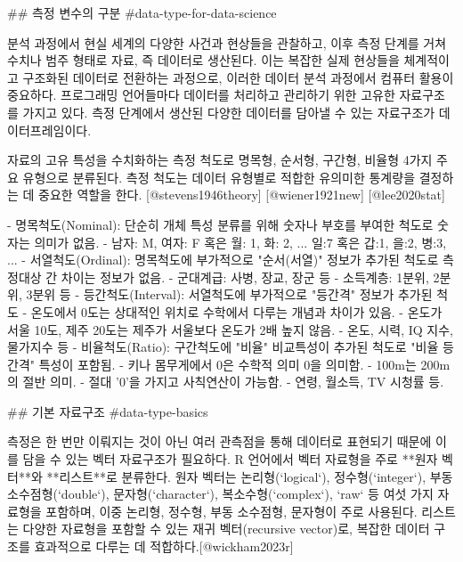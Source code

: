 \documentclass[
  letterpaper,
]{book}
\begin{document}
{## 측정 변수의 구분 {#data-type-for-data-science}


분석 과정에서 현실 세계의 다양한 사건과 현상들을 관찰하고, 이후 측정 단계를 거쳐 수치나 범주 형태로 자료, 즉 데이터로 생산된다.
이는 복잡한 실제 현상들을 체계적이고 구조화된 데이터로 전환하는 과정으로, 이러한 데이터 분석 과정에서 컴퓨터 활용이 중요하다.
프로그래밍 언어들마다 데이터를 처리하고 관리하기 위한 고유한 자료구조를 가지고 있다.
측정 단계에서 생산된 다양한 데이터를 담아낼 수 있는 자료구조가 데이터프레임이다.

자료의 고유 특성을 수치화하는 측정 척도로 명목형, 순서형, 구간형, 비율형 4가지 주요 유형으로 분류된다.
측정 척도는 데이터 유형별로 적합한 유의미한 통계량을 결정하는 데 중요한 역할을 한다.
[@stevens1946theory] [@wiener1921new] [@lee2020stat]

    

-   명목척도(Nominal): 단순히 개체 특성 분류를 위해 숫자나 부호를 부여한 척도로 숫자는 의미가 없음.
    -   남자: M, 여자: F 혹은 월: 1, 화: 2, ... 일:7 혹은 갑:1, 을:2, 병:3, ...
-   서열척도(Ordinal): 명목척도에 부가적으로 "순서(서열)" 정보가 추가된 척도로 측정대상 간 차이는 정보가 없음.
    -   군대계급: 사병, 장교, 장군 등
    -   소득계층: 1분위, 2분위, 3분위 등
-   등간척도(Interval): 서열척도에 부가적으로 "등간격" 정보가 추가된 척도
    -   온도에서 0도는 상대적인 위치로 수학에서 다루는 개념과 차이가 있음.
    -   온도가 서울 10도, 제주 20도는 제주가 서울보다 온도가 2배 높지 않음.
    -   온도, 시력, IQ 지수, 물가지수 등
-   비율척도(Ratio): 구간척도에 "비율" 비교특성이 추가된 척도로 "비율 등간격" 특성이 포함됨.
    -   키나 몸무게에서 0은 수학적 의미 0을 의미함.
    -   100m는 200m의 절반 의미.
    -   절대 '0'을 가지고 사칙연산이 가능함.
    -   연령, 월소득, TV 시청률 등.

## 기본 자료구조 {#data-type-basics}


측정은 한 번만 이뤄지는 것이 아닌 여러 관측점을 통해 데이터로 표현되기 때문에 이를 담을 수 있는 벡터 자료구조가 필요하다.
R 언어에서 벡터 자료형을 주로 **원자 벡터**와 **리스트**로 분류한다.
원자 벡터는 논리형(`logical`), 정수형(`integer`), 부동 소수점형(`double`), 문자형(`character`), 복소수형(`complex`), `raw` 등 여섯 가지 자료형을 포함하며, 이중 논리형, 정수형, 부동 소수점형, 문자형이 주로 사용된다.
리스트는 다양한 자료형을 포함할 수 있는 재귀 벡터(recursive vector)로, 복잡한 데이터 구조를 효과적으로 다루는 데 적합하다.[@wickham2023r]

}
\end{document}
